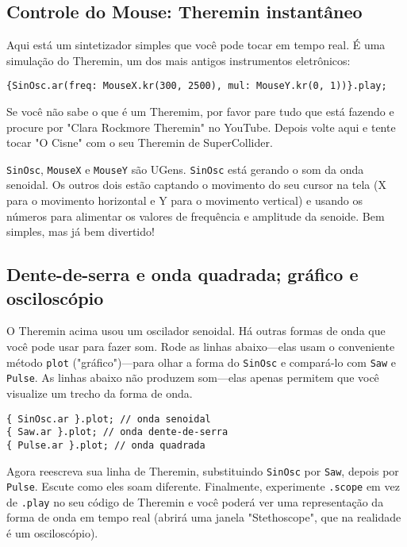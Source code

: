 \subsection{Controle do Mouse: Theremin instantâneo}

Aqui está um sintetizador simples que você pode tocar em tempo real. É uma simulação do Theremin, um dos mais antigos instrumentos eletrônicos:

\begin{lstlisting}[style=SuperCollider-IDE, basicstyle=\scttfamily\footnotesize]
{SinOsc.ar(freq: MouseX.kr(300, 2500), mul: MouseY.kr(0, 1))}.play;
\end{lstlisting}

Se você não sabe o que é um Theremim, por favor pare tudo que está fazendo e procure por "Clara Rockmore Theremin" no YouTube. Depois volte aqui e tente tocar "O Cisne" com o seu Theremin de SuperCollider.

\texttt{SinOsc}, \texttt{MouseX} e \texttt{MouseY} são UGens. \texttt{SinOsc} está gerando o som da onda senoidal. Os outros dois estão captando o movimento do seu cursor na tela (X para o movimento horizontal e Y para o movimento vertical) e usando os números para alimentar os valores de frequência e amplitude da senoide. Bem simples, mas já bem divertido!

\subsection{Dente-de-serra e onda quadrada; gráfico e osciloscópio}

O Theremin acima usou um oscilador senoidal. Há outras formas de onda que você pode usar para fazer som. Rode as linhas abaixo---elas usam o conveniente método \texttt{plot} ("gráfico")---para olhar a forma do \texttt{SinOsc} e compará-lo com \texttt{Saw} e \texttt{Pulse}. As linhas abaixo não produzem som---elas apenas permitem que você visualize um trecho da forma de onda.

\begin{lstlisting}[style=SuperCollider-IDE, basicstyle=\scttfamily\footnotesize]
{ SinOsc.ar }.plot; // onda senoidal
{ Saw.ar }.plot; // onda dente-de-serra
{ Pulse.ar }.plot; // onda quadrada
\end{lstlisting}

Agora reescreva sua linha de Theremin, substituindo \texttt{SinOsc} por \texttt{Saw}, depois por \texttt{Pulse}. Escute como eles soam diferente. Finalmente, experimente \texttt{.scope} em vez de \texttt{.play} no seu código de Theremin e você poderá ver uma representação da forma de onda em tempo real (abrirá uma janela "Stethoscope", que na realidade é um osciloscópio).
